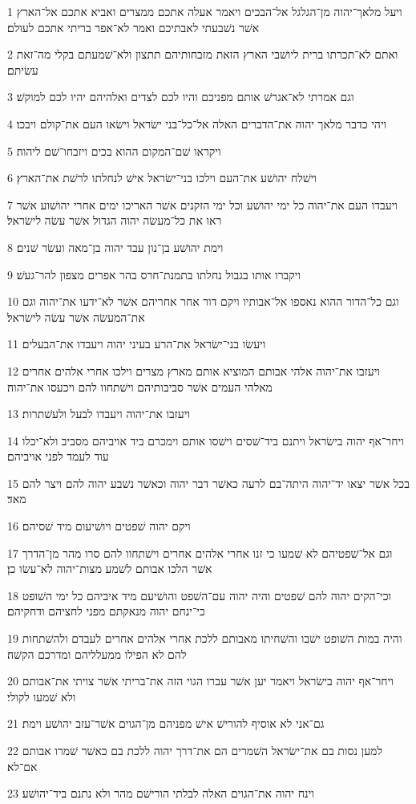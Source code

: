 \par 1 ויעל מלאך־יהוה מן־הגלגל אל־הבכים ויאמר אעלה אתכם ממצרים ואביא אתכם אל־הארץ אשׁר נשׁבעתי לאבתיכם ואמר לא־אפר בריתי אתכם לעולם׃
\par 2 ואתם לא־תכרתו ברית ליושׁבי הארץ הזאת מזבחותיהם תתצון ולא־שׁמעתם בקלי מה־זאת עשׂיתם׃
\par 3 וגם אמרתי לא־אגרשׁ אותם מפניכם והיו לכם לצדים ואלהיהם יהיו לכם למוקשׁ׃
\par 4 ויהי כדבר מלאך יהוה את־הדברים האלה אל־כל־בני ישׂראל וישׂאו העם את־קולם ויבכו׃
\par 5 ויקראו שׁם־המקום ההוא בכים ויזבחו־שׁם ליהוה׃
\par 6 וישׁלח יהושׁע את־העם וילכו בני־ישׂראל אישׁ לנחלתו לרשׁת את־הארץ׃
\par 7 ויעבדו העם את־יהוה כל ימי יהושׁע וכל ימי הזקנים אשׁר האריכו ימים אחרי יהושׁוע אשׁר ראו את כל־מעשׂה יהוה הגדול אשׁר עשׂה לישׂראל׃
\par 8 וימת יהושׁע בן־נון עבד יהוה בן־מאה ועשׂר שׁנים׃
\par 9 ויקברו אותו בגבול נחלתו בתמנת־חרס בהר אפרים מצפון להר־געשׁ׃
\par 10 וגם כל־הדור ההוא נאספו אל־אבותיו ויקם דור אחר אחריהם אשׁר לא־ידעו את־יהוה וגם את־המעשׂה אשׁר עשׂה לישׂראל׃
\par 11 ויעשׂו בני־ישׂראל את־הרע בעיני יהוה ויעבדו את־הבעלים׃
\par 12 ויעזבו את־יהוה אלהי אבותם המוציא אותם מארץ מצרים וילכו אחרי אלהים אחרים מאלהי העמים אשׁר סביבותיהם וישׁתחוו להם ויכעסו את־יהוה׃
\par 13 ויעזבו את־יהוה ויעבדו לבעל ולעשׁתרות׃
\par 14 ויחר־אף יהוה בישׂראל ויתנם ביד־שׁסים וישׁסו אותם וימכרם ביד אויביהם מסביב ולא־יכלו עוד לעמד לפני אויביהם׃
\par 15 בכל אשׁר יצאו יד־יהוה היתה־בם לרעה כאשׁר דבר יהוה וכאשׁר נשׁבע יהוה להם ויצר להם מאד׃
\par 16 ויקם יהוה שׁפטים ויושׁיעום מיד שׁסיהם׃
\par 17 וגם אל־שׁפטיהם לא שׁמעו כי זנו אחרי אלהים אחרים וישׁתחוו להם סרו מהר מן־הדרך אשׁר הלכו אבותם לשׁמע מצות־יהוה לא־עשׂו כן׃
\par 18 וכי־הקים יהוה להם שׁפטים והיה יהוה עם־השׁפט והושׁיעם מיד איביהם כל ימי השׁופט כי־ינחם יהוה מנאקתם מפני לחציהם ודחקיהם׃
\par 19 והיה במות השׁופט ישׁבו והשׁחיתו מאבותם ללכת אחרי אלהים אחרים לעבדם ולהשׁתחות להם לא הפילו ממעלליהם ומדרכם הקשׁה׃
\par 20 ויחר־אף יהוה בישׂראל ויאמר יען אשׁר עברו הגוי הזה את־בריתי אשׁר צויתי את־אבותם ולא שׁמעו לקולי׃
\par 21 גם־אני לא אוסיף להורישׁ אישׁ מפניהם מן־הגוים אשׁר־עזב יהושׁע וימת׃
\par 22 למען נסות בם את־ישׂראל השׁמרים הם את־דרך יהוה ללכת בם כאשׁר שׁמרו אבותם אם־לא׃
\par 23 וינח יהוה את־הגוים האלה לבלתי הורישׁם מהר ולא נתנם ביד־יהושׁע׃

